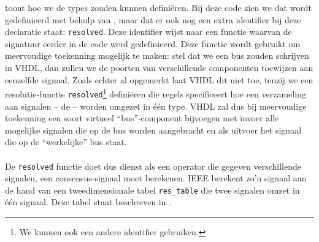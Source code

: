  toont hoe we de types zouden kunnen defini\"eren. Bij deze code zien we dat  wordt gedefinieerd met behulp van , maar dat er ook nog een extra identifier bij deze declaratie staat: \texttt{resolved}. Deze identifier wijst naar een functie waarvan de signatuur eerder in de code werd gedefinieerd. Deze functie wordt gebruikt om meervoudige toekenning mogelijk te maken: stel dat we een bus zouden schrijven in VHDL, dan zullen we de poorten van verschillende componenten toewijzen aan eenzelfde signaal. Zoals echter al opgemerkt laat VHDL dit niet toe, tenzij we een resolutie-functie \texttt{resolved}\footnote{We kunnen ook een andere identifier gebruiken.} defini\"eren die regels specificeert hoe een verzameling aan signalen -- de  -- worden omgezet in \'e\'en type. VHDL zal dus bij meervoudige toekenning een soort virtueel ``bus''-component bijvoegen met invoer alle mogelijke signalen die op de bus worden aangebracht en als uitvoer het signaal die op de ``werkelijke'' bus staat.

\paragraph{}
De \texttt{resolved} functie doet dus dienst als een operator die gegeven verschillende signalen, een consensus-signaal moet berekenen. IEEE berekent zo'n signaal aan de hand van een tweedimensionale tabel \texttt{res\_table} die twee signalen omzet in \'e\'en signaal. Deze tabel staat beschreven in .


